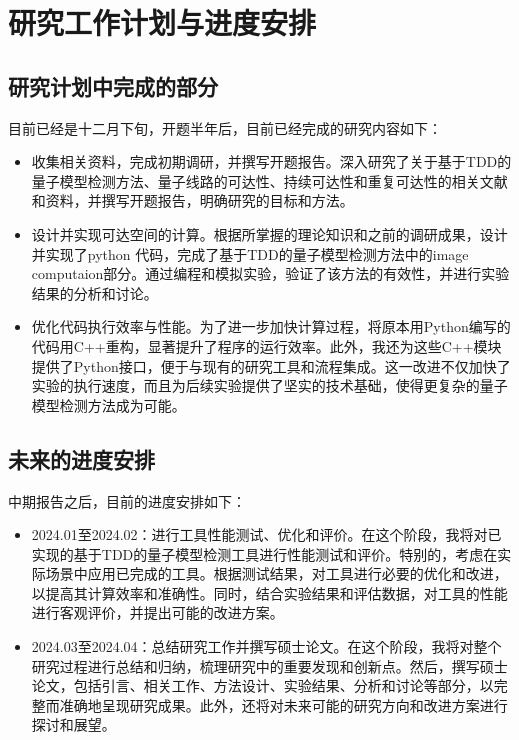 \section{研究工作计划与进度安排}
\subsection{研究计划中完成的部分}
目前已经是十二月下旬，开题半年后，目前已经完成的研究内容如下：
\begin{itemize}
    \item 收集相关资料，完成初期调研，并撰写开题报告。深入研究了关于基于TDD的量子模型检测方法、量子线路的可达性、持续可达性和重复可达性的相关文献和资料，并撰写开题报告，明确研究的目标和方法。
    \item 设计并实现可达空间的计算。根据所掌握的理论知识和之前的调研成果，设计并实现了python 代码，完成了基于TDD的量子模型检测方法中的image computaion部分。通过编程和模拟实验，验证了该方法的有效性，并进行实验结果的分析和讨论。
    \item 优化代码执行效率与性能。为了进一步加快计算过程，将原本用Python编写的代码用C++重构，显著提升了程序的运行效率。此外，我还为这些C++模块提供了Python接口，便于与现有的研究工具和流程集成。这一改进不仅加快了实验的执行速度，而且为后续实验提供了坚实的技术基础，使得更复杂的量子模型检测方法成为可能。
\end{itemize}
\subsection{未来的进度安排}
中期报告之后，目前的进度安排如下： 
\begin{itemize}
    \item 2024.01至2024.02：进行工具性能测试、优化和评价。在这个阶段，我将对已实现的基于TDD的量子模型检测工具进行性能测试和评价。特别的，考虑在实际场景中应用已完成的工具。根据测试结果，对工具进行必要的优化和改进，以提高其计算效率和准确性。同时，结合实验结果和评估数据，对工具的性能进行客观评价，并提出可能的改进方案。
    \item 2024.03至2024.04：总结研究工作并撰写硕士论文。在这个阶段，我将对整个研究过程进行总结和归纳，梳理研究中的重要发现和创新点。然后，撰写硕士论文，包括引言、相关工作、方法设计、实验结果、分析和讨论等部分，以完整而准确地呈现研究成果。此外，还将对未来可能的研究方向和改进方案进行探讨和展望。
\end{itemize}

